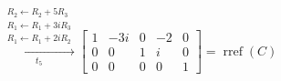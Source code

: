 \begin{enumerate}
\begin{answer}
        $\xrightarrow[t_5]{
            \substack{
                R_2 \leftarrow R_2+5R_3 \\
                R_1 \leftarrow R_1+3iR_3 \\
                R_1 \leftarrow R_1+2iR_2
            }
        }
        \begin{bmatrix}
            1 & -3i & 0 & -2 & 0 \\
            0 & 0 & 1 & i & 0 \\
            0 & 0 & 0 & 0 & 1
        \end{bmatrix}
        = \operatorname{rref}(C)$
    \end{answer}
\end{enumerate}
